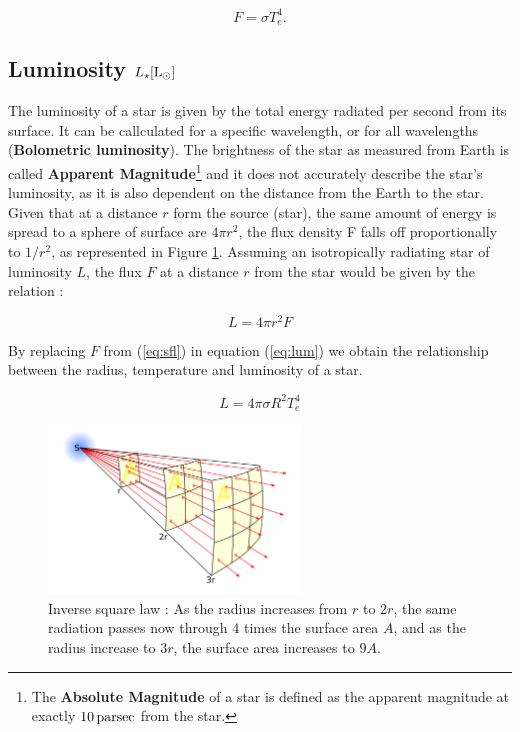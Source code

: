 \begin{equation}\label{eq:sfl}
	F
	=\sigma T_e^4. 
\end{equation}

\subsection{Luminosity $L_\star [\rm{L_\odot}]$}

The luminosity of a star is given by the total energy radiated per second from its surface. It can be callculated for a specific wavelength, or for all wavelengths (\textbf{Bolometric luminosity}). The brightness of the star as measured from Earth is called \textbf{Apparent Magnitude}\footnote[1]{The \textbf{Absolute Magnitude} of a star is defined as the apparent magnitude at exactly $10\, \rm{parsec}$ from the star.} and it does not accurately describe the star's luminosity, as it is also dependent on the distance from the Earth to the star. Given that at a distance $r$ form the source (star), the same amount of energy is spread to a sphere of surface are $4\pi r^2$, the flux density F falls off proportionally to $1/r^2$, as represented in Figure \ref{fig:inverse-square-law}. Assuming an isotropically radiating star of luminosity $L$, the flux $F$ at a distance $r$ from the star would be given by the relation \cite{Karttunen2017}:

\begin{equation}\label{eq:lum}
	L = 4\pi r^2 F
\end{equation}

By replacing $F$ from (\ref{eq:sfl}) in equation (\ref{eq:lum}) we obtain the relationship between the radius, temperature and luminosity of a star. 

\begin{equation}\label{eq:essential-relation}
	L = 4\pi\sigma R^2 T_e^4 
\end{equation}

\begin{figure}[h]
	\centering
	\includegraphics[width=0.6\textwidth]{img/inverse-square-law}%
  	\caption{Inverse square law \protect\footnotemark[1]: As the radius increases from $r$ to $2r$, the same radiation passes now through 4 times the surface area $A$, and as the radius increase to $3r$, the surface area increases to $9A$.}
  	\label{fig:inverse-square-law}
\end{figure}
\protect{}

